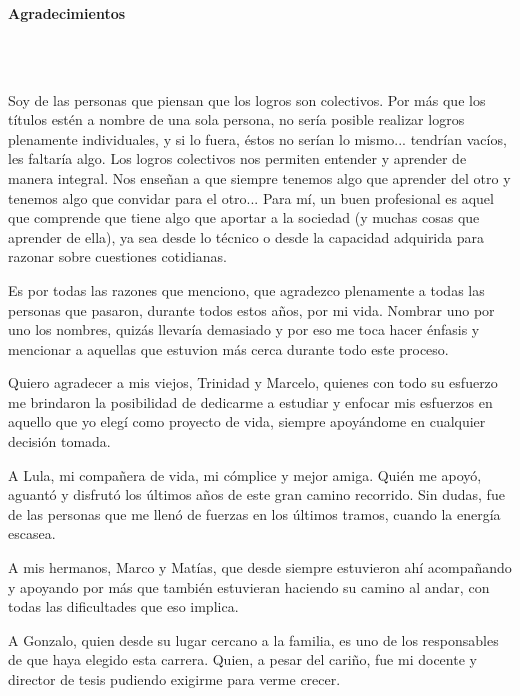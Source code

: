 \newpage
\thispagestyle{empty} \textbf{}\normalsize
\\\\\\%
\textbf{\LARGE Agradecimientos}
\\\\
\justifying

  \par Soy de las personas que piensan que los logros son colectivos. Por más que
    los títulos estén a nombre de una sola persona, no sería posible realizar logros
    plenamente individuales, y si lo fuera, éstos no serían lo mismo... tendrían
    vacíos, les faltaría algo. Los logros colectivos nos permiten entender y aprender
    de manera integral. Nos enseñan a que siempre tenemos algo que aprender del otro
    y tenemos algo que convidar para el otro... Para mí, un buen profesional es
    aquel que comprende que tiene algo que aportar a la sociedad
    (y muchas cosas que aprender de ella),
    ya sea desde lo técnico o desde la capacidad adquirida para razonar sobre
    cuestiones cotidianas.

  \par Es por todas las razones que menciono, que agradezco plenamente a todas las
    personas que pasaron, durante todos estos años, por mi vida. Nombrar uno
    por uno los nombres, quizás llevaría demasiado y por eso me toca hacer
    énfasis y mencionar a aquellas que estuvion más cerca durante todo
    este proceso.

  \par Quiero agradecer a mis viejos, Trinidad y Marcelo, quienes con todo su esfuerzo
    me brindaron la posibilidad de dedicarme a estudiar y enfocar mis esfuerzos en
    aquello que yo elegí como proyecto de vida, siempre apoyándome en cualquier
    decisión tomada.

  \par A Lula, mi compañera de vida, mi cómplice y mejor amiga. Quién me apoyó,
    aguantó y disfrutó los últimos años de este gran camino recorrido. Sin
    dudas, fue de las personas que me llenó de fuerzas en los últimos tramos, cuando
    la energía escasea.

  \par A mis hermanos, Marco y Matías, que desde siempre estuvieron ahí
    acompañando y apoyando por más que también estuvieran haciendo su
    camino al andar, con todas las dificultades que eso implica.

  \par A Gonzalo, quien desde su lugar cercano a la familia, es uno de los
  responsables de que haya elegido esta carrera. Quien, a pesar del cariño,
  fue mi docente y director de tesis pudiendo exigirme para verme crecer.


